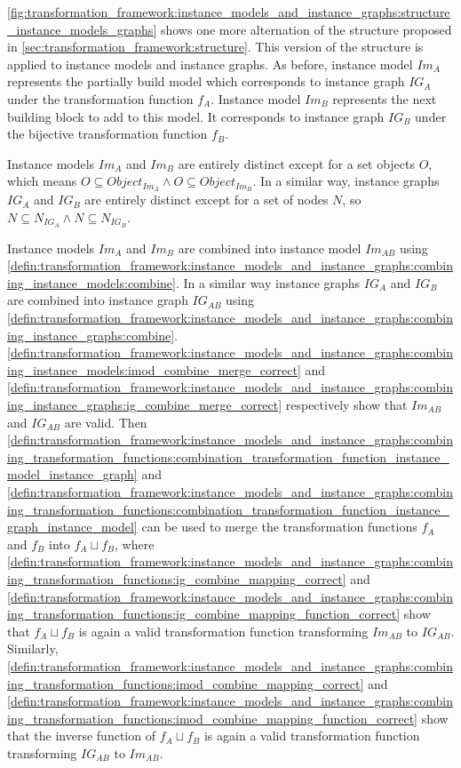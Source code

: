 \cref{fig:transformation_framework:instance_models_and_instance_graphs:structure_instance_models_graphs} shows one more alternation of the structure proposed in \cref{sec:transformation_framework:structure}. This version of the structure is applied to instance models and instance graphs. As before, instance model $Im_A$ represents the partially build model which corresponds to instance graph $IG_A$ under the transformation function $f_A$. Instance model $Im_B$ represents the next building block to add to this model. It corresponds to instance graph $IG_B$ under the bijective transformation function $f_B$.

Instance models $Im_A$ and $Im_B$ are entirely distinct except for a set objects $O$, which means $O \subseteq Object_{Im_A} \land O \subseteq Object_{Im_B}$. In a similar way, instance graphs $IG_A$ and $IG_B$ are entirely distinct except for a set of nodes $N$, so $N \subseteq N_{IG_A} \land N \subseteq N_{IG_B}$.

Instance models $Im_A$ and $Im_B$ are combined into instance model $Im_{AB}$ using \cref{defin:transformation_framework:instance_models_and_instance_graphs:combining_instance_models:combine}. In a similar way instance graphs $IG_A$ and $IG_B$ are combined into instance graph $IG_{AB}$ using \cref{defin:transformation_framework:instance_models_and_instance_graphs:combining_instance_graphs:combine}. \cref{defin:transformation_framework:instance_models_and_instance_graphs:combining_instance_models:imod_combine_merge_correct} and \cref{defin:transformation_framework:instance_models_and_instance_graphs:combining_instance_graphs:ig_combine_merge_correct} respectively show that $Im_{AB}$ and $IG_{AB}$ are valid. Then \cref{defin:transformation_framework:instance_models_and_instance_graphs:combining_transformation_functions:combination_transformation_function_instance_model_instance_graph} and \cref{defin:transformation_framework:instance_models_and_instance_graphs:combining_transformation_functions:combination_transformation_function_instance_graph_instance_model} can be used to merge the transformation functions $f_A$ and $f_B$ into $f_{A} \sqcup f_{B}$, where \cref{defin:transformation_framework:instance_models_and_instance_graphs:combining_transformation_functions:ig_combine_mapping_correct} and \cref{defin:transformation_framework:instance_models_and_instance_graphs:combining_transformation_functions:ig_combine_mapping_function_correct} show that $f_{A} \sqcup f_{B}$ is again a valid transformation function transforming $Im_{AB}$ to $IG_{AB}$. Similarly, \cref{defin:transformation_framework:instance_models_and_instance_graphs:combining_transformation_functions:imod_combine_mapping_correct} and \cref{defin:transformation_framework:instance_models_and_instance_graphs:combining_transformation_functions:imod_combine_mapping_function_correct} show that the inverse function of $f_{A} \sqcup f_{B}$ is again a valid transformation function transforming $IG_{AB}$ to $Im_{AB}$.



